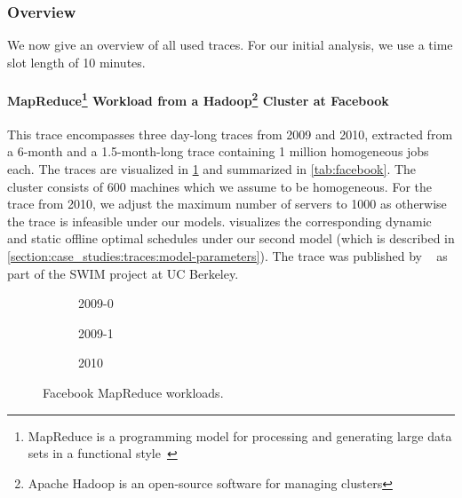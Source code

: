 \subsubsection{Overview}

We now give an overview of all used traces. For our initial analysis, we use a time slot length of 10 minutes.

\paragraph{MapReduce\footnote{MapReduce is a programming model for processing and generating large data sets in a functional style~\cite{Dean2004}} Workload from a Hadoop\footnote{Apache Hadoop is an open-source software for managing clusters} Cluster at Facebook~\cite{SWIM2013}} This trace encompasses three day-long traces from 2009 and 2010, extracted from a 6-month and a 1.5-month-long trace containing 1 million homogeneous jobs each. The traces are visualized in \cref{fig:facebook:histogram} and summarized in \cref{tab:facebook}. The cluster consists of 600 machines which we assume to be homogeneous. For the trace from 2010, we adjust the maximum number of servers to 1000 as otherwise the trace is infeasible under our models.  visualizes the corresponding dynamic and static offline optimal schedules under our second model (which is described in \cref{section:case_studies:traces:model-parameters}). The trace was published by \citeauthor*{SWIM2013}~\cite{SWIM2013} as part of the SWIM project at UC Berkeley.

\begin{figure}
    \begin{subfigure}[b]{.3425\linewidth}
    \resizebox{\textwidth}{!}{}
    \caption{2009-0}
    \end{subfigure}
    \begin{subfigure}[b]{.32\linewidth}
    \resizebox{\textwidth}{!}{}
    \caption{2009-1}
    \end{subfigure}
    \begin{subfigure}[b]{.32\linewidth}
    \resizebox{\textwidth}{!}{}
    \caption{2010}
    \end{subfigure}
    \caption{Facebook MapReduce workloads.}
    \label{fig:facebook:histogram}
\end{figure}

